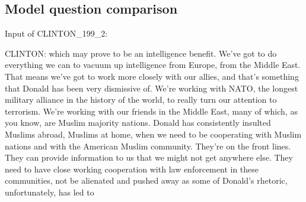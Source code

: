 \documentclass[11pt]{article}
\begin{document}
\subsection{Model question comparison}
\label{sec: question comparison}
Input of CLINTON\_199\_2:


CLINTON: which may prove to be an intelligence benefit. We've got to do everything we can to vacuum up intelligence from Europe, from the Middle East. That means we've got to work more closely with our allies, and that's something that Donald has been very dismissive of. We're working with NATO, the longest military alliance in the history of the world, to really turn our attention to terrorism. We're working with our friends in the Middle East, many of which, as you know, are Muslim majority nations. Donald has consistently insulted Muslims abroad, Muslims at home, when we need to be cooperating with Muslim nations and with the American Muslim community. They're on the front lines. They can provide information to us that we might not get anywhere else. They need to have close working cooperation with law enforcement in these communities, not be alienated and pushed away as some of Donald's rhetoric, unfortunately, has led to
\end{document}
